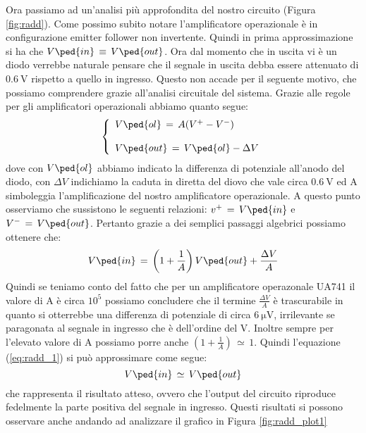 Ora passiamo ad un'analisi più approfondita del nostro circuito (Figura \ref{fig:radd}). Come possimo subito notare l'amplificatore operazionale è in configurazione emitter follower non invertente. Quindi in prima approssimazione si ha che $V\ped{in}\,\equiv\,V\ped{out}$. Ora dal momento che in uscita vi è un diodo verrebbe naturale pensare che il segnale in uscita debba essere attenuato di $\SI{0.6}{\volt}$ rispetto a quello in ingresso. Questo non accade per il seguente motivo, che possiamo comprendere grazie all'analisi circuitale del sistema. Grazie alle regole per gli amplificatori operazionali abbiamo quanto segue:
\begin{equation}
        \left\{
                \begin{array}{l l l}
                        V\ped{ol}\,=\,A(V^+ - V^-)\\
                        \\
                        V\ped{out}\,=\,V\ped{ol}-\Delta V
                \end{array}
         \right.
         \label{eq:radd_1}
\end{equation}
dove con $V\ped{ol}$ abbiamo indicato la differenza di potenziale all'anodo del diodo, con $\Delta V$ indichiamo la caduta in diretta del diovo che vale circa $\SI{0.6}{\volt}$ ed A simboleggia l'amplificazione del nostro amplificatore operazionale.
A questo punto osserviamo che sussistono le seguenti relazioni: $v^+\,=\,V\ped{in}$ e $V^-\,=\,V\ped{out}$. Pertanto grazie a dei semplici passaggi algebrici possiamo ottenere che:
\begin{equation}
        V\ped{in}\,=\,\left(1+\frac{1}{A}\right)V\ped{out} + \frac{\Delta V}{A}
\end{equation}
Quindi se teniamo conto del fatto che per un amplificatore operazonale UA741 il valore di A è circa $10^5$ possiamo concludere che il termine $\frac{\Delta V}{A}$ è trascurabile in quanto si otterrebbe una differenza di potenziale di circa $\SI{6}{\micro\volt}$, irrilevante se paragonata al segnale in ingresso che è dell'ordine del $\si{\volt}$. Inoltre sempre per l'elevato valore di A possiamo porre anche $\left(1+\frac{1}{A}\right)\,\simeq\,1$. Quindi l'equazione (\ref{eq:radd_1}) si può approssimare come segue:
\begin{equation}
        V\ped{in}\,\simeq\,V\ped{out}
        \label{eq:radd_2}
\end{equation}
che rappresenta il risultato atteso, ovvero che l'output del circuito riproduce fedelmente la parte positiva del segnale in ingresso.
Questi risultati si possono osservare anche andando ad analizzare il grafico in Figura \ref{fig:radd_plot1}


